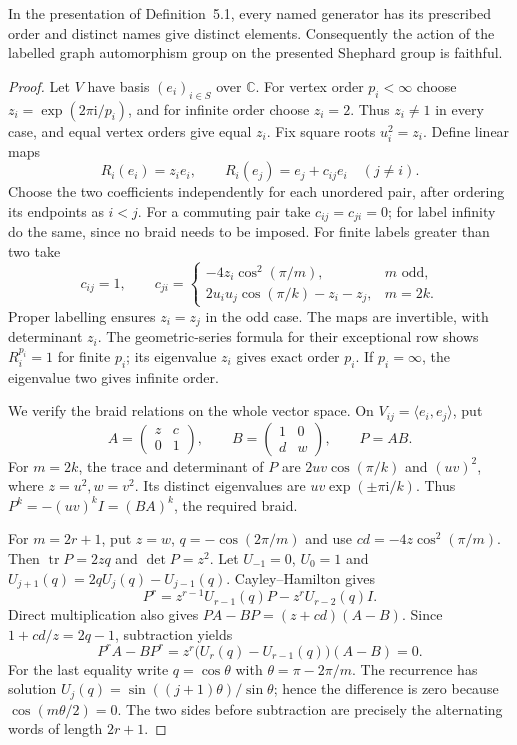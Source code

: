 \begin{proposition}\label{prop:shephard}
In the presentation of Definition~5.1, every named generator has its
prescribed order and distinct names give distinct elements. Consequently
the action of the labelled graph automorphism group on the presented
Shephard group is faithful.
\end{proposition}
\begin{proof}
Let $V$ have basis $(e_i)_{i\in S}$ over $\mathbb C$. For vertex order
$p_i<\infty$ choose $z_i=\exp(2\pi\mathrm i/p_i)$, and for infinite
order choose $z_i=2$. Thus $z_i\ne1$ in every case, and equal vertex
orders give equal $z_i$. Fix square roots $u_i^2=z_i$.
Define linear maps
\[
 R_i(e_i)=z_i e_i,\qquad R_i(e_j)=e_j+c_{ij}e_i\quad(j\ne i).
\]
Choose the two coefficients independently for each unordered pair,
after ordering its endpoints as $i<j$. For a commuting pair take
$c_{ij}=c_{ji}=0$; for label infinity do the same, since no braid
needs to be imposed. For finite labels greater than two take
\[
 c_{ij}=1,\qquad c_{ji}=
 \begin{cases}
 -4z_i\cos^2(\pi/m),&m\text{ odd},\\
 2u_i u_j\cos(\pi/k)-z_i-z_j,&m=2k.
 \end{cases}
\]
Proper labelling ensures $z_i=z_j$ in the odd case.
The maps are invertible, with determinant $z_i$. The geometric-series
formula for their exceptional row shows $R_i^{p_i}=1$ for finite $p_i$;
its eigenvalue $z_i$ gives exact order $p_i$. If $p_i=\infty$, the
eigenvalue two gives infinite order.

We verify the braid relations on the whole vector space. On
$V_{ij}=\langle e_i,e_j\rangle$, put
\[
 A=\begin{pmatrix}z&c\\0&1\end{pmatrix},\qquad
 B=\begin{pmatrix}1&0\\d&w\end{pmatrix},\qquad P=AB.
\]
For $m=2k$, the trace and determinant of $P$ are
$2uv\cos(\pi/k)$ and $(uv)^2$, where $z=u^2,w=v^2$.
Its distinct eigenvalues are $uv\exp(\pm\pi\mathrm i/k)$.
Thus $P^k=-(uv)^kI=(BA)^k$, the required braid.

For $m=2r+1$, put $z=w$, $q=-\cos(2\pi/m)$ and use
$cd=-4z\cos^2(\pi/m)$. Then $\operatorname{tr}P=2zq$ and
$\det P=z^2$. Let $U_{-1}=0$, $U_0=1$ and
$U_{j+1}(q)=2qU_j(q)-U_{j-1}(q)$. Cayley--Hamilton gives
\[
 P^r=z^{r-1}U_{r-1}(q)P-z^rU_{r-2}(q)I.
\]
Direct multiplication also gives
$PA-BP=(z+cd)(A-B)$. Since $1+cd/z=2q-1$, subtraction yields
\[
 P^rA-BP^r=z^r\bigl(U_r(q)-U_{r-1}(q)\bigr)(A-B)=0.
\]
For the last equality write $q=\cos\theta$ with
$\theta=\pi-2\pi/m$. The recurrence has solution
$U_j(q)=\sin((j+1)\theta)/\sin\theta$; hence the difference is
zero because $\cos(m\theta/2)=0$. The two sides before subtraction
are precisely the alternating words of length $2r+1$.


\end{proof}
